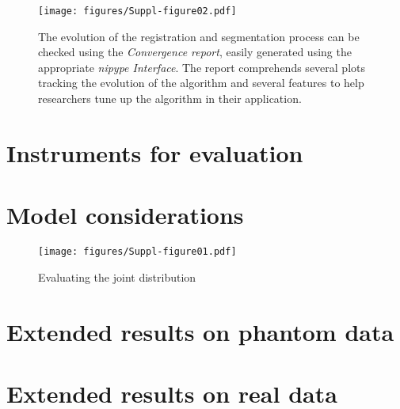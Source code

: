 \documentclass[a4paper]{report}
\begin{document}
\begin{figure*}[!ht]
	\texttt{[image: figures/Suppl-figure02.pdf]}
	\caption{The evolution of the registration and segmentation process can be
	  checked using the \emph{Convergence report},
	  easily generated using the appropriate \emph{nipype Interface}.
	The report comprehends several plots tracking the evolution of the algorithm and several
	  features to help researchers tune up the algorithm in their application.}%
	  \label{fig:convreport}
\end{figure*}

\section{Instruments for evaluation}

\section{Model considerations}

\begin{figure*}[!ht]
	\texttt{[image: figures/Suppl-figure01.pdf]}
	\caption{Evaluating the joint distribution}\label{fig:jointplot}
\end{figure*}

\section{Extended results on phantom data}

\section{Extended results on real data}
\end{document}
